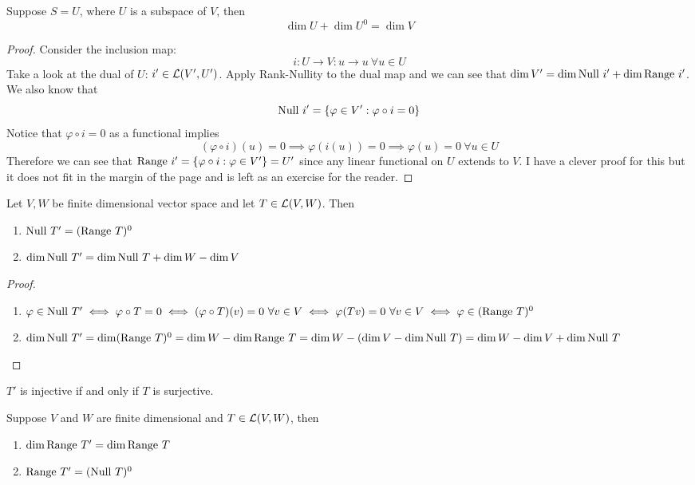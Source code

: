 \begin{theorem}
    Suppose $S = U$, where $U$ is a subspace of $V$, then 
    \[ \dim U + \dim U^0 = \dim V\]
\end{theorem}
\begin{proof}
    Consider the inclusion map: \[i : U \to V : u \to u \ \forall u \in U\] 
    Take  a look at the dual of $U$: $i' \in \mathcal L(V', U')$. Apply Rank-Nullity to the dual map and we can see that $\dim V' = \dim \text{Null } i' + \dim \text{Range } i'$. We also know that \[\text{Null } i' = \left\{ \varphi \in V' : \varphi \circ i = 0 \right\}\] Notice that $\varphi \circ i = 0$ as a functional implies \[(\varphi \circ i) (u) = 0 \implies \varphi(i(u)) = 0 \implies \varphi(u) = 0 \ \forall u \in U \]
    Therefore we can see that $\text{Range } i' = \left\{ \varphi \circ i : \varphi \in V' \right\} = U'$ since any linear functional on $U$ extends to $V$. I have a clever proof for this but it does not fit in the margin of the page and is left as an exercise for the reader. 
\end{proof}
\begin{theorem}
    Let $V,W$ be finite dimensional vector space and let $T \in \mathcal L(V,W)$. Then 
    \begin{enumerate}[label = (\alph*)]
        \item $\text{Null } T' = (\text{Range } T)^0$
        \item $\dim \text{Null } T' = \dim \text{Null } T + \dim W - \dim V$
    \end{enumerate}
\end{theorem}
\begin{proof} $ $
    \begin{enumerate}[label = (\alph*)]
        \item $\varphi \in \text{Null } T' \iff \varphi \circ T = 0 \iff (\varphi \circ T)(v) = 0 \ \forall v \in V \iff \varphi(Tv) = 0 \ \forall v \in V \\ \iff \varphi \in (\text{Range } T)^0$
        \item $\dim \text{Null } T' = \dim (\text{Range } T)^0 = \dim W - \dim \text{Range } T = \dim W - (\dim V - \dim \text{Null } T) = \dim W - \dim V + \dim \text{Null } T$
    \end{enumerate}
\end{proof}
\begin{corollary}
    $T'$ is injective if and only if $T$ is surjective.
\end{corollary}
\begin{theorem}
    Suppose $V$ and $W$ are finite dimensional and $T \in \mathcal L(V,W)$, then 
    \begin{enumerate}[label = (\alph*)]
        \item $\dim \text{Range } T' = \dim \text{Range } T$
        \item $\text{Range } T' = (\text{Null } T)^0$
    \end{enumerate}
\end{theorem}

